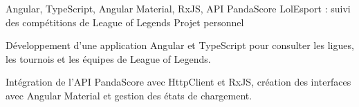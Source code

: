 
\begin{cventries}
  \cventry
    {Angular, TypeScript, Angular Material, RxJS, API PandaScore}
    {LolEsport : suivi des compétitions de League of Legends}
    {Projet personnel}
    {}
    {
      \begin{cvitems}
        \item {Développement d’une application Angular et TypeScript pour consulter les ligues, les tournois et les équipes de League of Legends.}
        \item {Intégration de l’API PandaScore avec HttpClient et RxJS, création des interfaces avec Angular Material et gestion des états de chargement.}
      \end{cvitems}
    }
\end{cventries}
